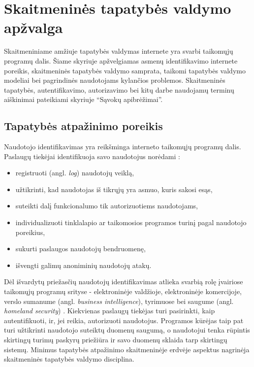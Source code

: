 \section{Skaitmeninės tapatybės valdymo apžvalga}

Skaitmeniniame amžiuje tapatybės valdymas internete
yra svarbi taikomųjų programų dalis. Šiame skyriuje apžvelgiamas asmenų identifikavimo internete poreikis,
skaitmeninės tapatybės valdymo samprata, taikomi tapatybės valdymo modeliai bei pagrindinės naudotojams
kylančios problemos. Skaitmeninės tapatybės, autentifikavimo, autorizavimo bei kitų darbe
naudojamų terminų aiškinimai pateikiami skyriuje \enquote{Sąvokų apibrėžimai}.

\subsection{Tapatybės atpažinimo poreikis}

Naudotojo identifikavimas yra reikšminga interneto taikomųjų
programų dalis. Paslaugų tiekėjai identifikuoja savo naudotojus norėdami \cite{RalucaBudiu2014}:

\begin{itemize}
    \item registruoti (angl. \textit{log}) naudotojų veiklą,
    \item užtikrinti, kad naudotojas iš tikrųjų yra asmuo, kuris sakosi esąs,
    \item suteikti dalį funkcionalumo tik autorizuotiems naudotojams,
    \item individualizuoti tinklalapio ar taikomosios programos turinį pagal naudotojo poreikius,
    \item sukurti paslaugos naudotojų bendruomenę,
    \item išvengti galimų anoniminių naudotojų atakų.
\end{itemize}

Dėl išvardytų priežasčių naudotojų identifikavimas atlieka svarbią rolę įvairiose taikomųjų programų
srityse - elektroninėje valdžioje, elektroninėje komercijoje, verslo sumanume
(angl. \textit{business intelligence}), tyrimuose bei saugume
(angl. \textit{homeland security}) \cite{Glasser2009}. Kiekvienas paslaugų tiekėjas turi pasirinkti,
kaip autentifikuoti, ir, jei reikia, autorizuoti naudotojus. Programos kūrėjas taip pat turi užtikrinti naudotojo
suteiktų duomenų saugumą, o naudotojui tenka rūpintis skirtingų turimų
paskyrų priežiūra ir savo duomenų sklaida tarp skirtingų sistemų. Minimus tapatybės atpažinimo
skaitmeninėje erdvėje aspektus nagrinėja skaitmeninės tapatybės valdymo disciplina.


